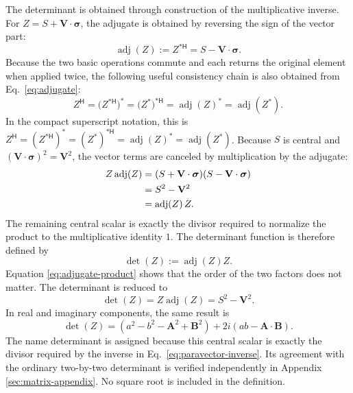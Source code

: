 \documentclass[10pt,letterpaper]{article}
\newcommand{\eqfunc}[1]{\operatorname{#1}}
\newcommand{\pv}[1]{#1}
\newcommand{\vct}[1]{\mathbf{#1}}
\newcommand{\sigv}{\vct{\pv{\bm{\sigma}}}}
\newcommand{\Hop}{\mathsf H}
\newcommand{\herm}[1]{#1^{\Hop}}
\newcommand{\conj}[1]{#1^{*}}
\newcommand{\cherm}[1]{#1^{*\Hop}}
\newcommand{\detf}[1]{\eqfunc{det}\!\left(#1\right)}
\newcommand{\adjf}[1]{\eqfunc{adj}\!\left(#1\right)}
\begin{document}
The determinant is obtained through construction of the multiplicative inverse. For
\(\pv{Z}=S+\vct{V}\cdot\sigv\), the adjugate is obtained by reversing the sign of the vector part:
\begin{equation}
\adjf{\pv{Z}}
:=\cherm{\pv{Z}}
=S-\vct{V}\cdot\sigv.
\label{eq:adjugate}
\end{equation}
Because the two basic operations commute and each returns the original
element when applied twice, the following useful consistency chain is also
obtained from Eq.\ \eqref{eq:adjugate}:
\begin{equation}
\herm{\pv{Z}}
=\conj{\bigl(\cherm{\pv{Z}}\bigr)}
=\cherm{\bigl(\conj{\pv{Z}}\bigr)}
=\conj{\adjf{\pv{Z}}}
=\adjf{\conj{\pv{Z}}}.
\label{eq:hermitian-adjugate-identity}
\end{equation}
In the compact superscript notation, this is
\(\pv{Z}^{\Hop}=(\pv{Z}^{*\Hop})^*
=(\pv{Z}^*)^{*\Hop}
=\adjf{\pv{Z}}^*=\adjf{\pv{Z}^*}\).
Because \(S\) is central and
\((\vct{V}\cdot\sigv)^2=\vct{V}^2\), the vector terms are canceled by multiplication by the adjugate:
\begin{align}
\pv{Z}\adjf{\pv{Z}}
&=(S+\vct{V}\cdot\sigv)(S-\vct{V}\cdot\sigv)\notag\\
&=S^2-\vct{V}^2\notag\\
&=\adjf{\pv{Z}}\pv{Z}.
\label{eq:adjugate-product}
\end{align}
The remaining central scalar is exactly the divisor required to normalize the product to the multiplicative identity \(1\). The determinant function is therefore defined by
\begin{equation}
\detf{\pv{Z}}:=\adjf{\pv{Z}}\pv{Z}.
\label{eq:determinant-function}
\end{equation}
Equation \eqref{eq:adjugate-product} shows that the order of the two factors
does not matter. The determinant is reduced to
\begin{equation}
\detf{\pv{Z}}=\pv{Z}\adjf{\pv{Z}}=S^2-\vct{V}^2.
\label{eq:minkowski-form}
\end{equation}
In real and imaginary components, the same result is
\begin{equation}
\detf{\pv{Z}}
=(a^2-b^2-\vct{A}^2+\vct{B}^2)
+2i(ab-\vct{A}\cdot\vct{B}).
\label{eq:determinant-components}
\end{equation}
The name determinant is assigned because this central scalar is exactly the
divisor required by the inverse in Eq.\ \eqref{eq:paravector-inverse}. Its
agreement with the ordinary two-by-two determinant is verified independently
in Appendix \ref{sec:matrix-appendix}. No square root is included in the
definition.
\end{document}
